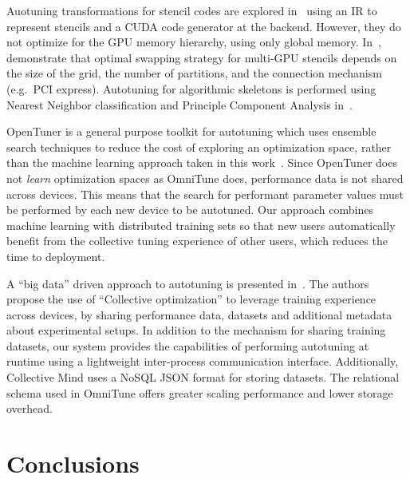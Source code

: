 \documentclass[nonatbib,preprint,nocopyrightspace,9pt]{sigplanconf}
\begin{document}
Auotuning transformations for stencil codes are explored
in~\cite{Kamil2010} using an IR to represent stencils and a CUDA code
generator at the backend. However, they do not optimize for the GPU
memory hierarchy, using only global memory. In~\cite{Lutz2013},
\citeauthor{Lutz2013} demonstrate that optimal swapping strategy for
multi-GPU stencils depends on the size of the grid, the number of
partitions, and the connection mechanism (e.g.\ PCI
express). Autotuning for algorithmic skeletons is performed using
Nearest Neighbor classification and Principle Component Analysis
in~\cite{Collins2013}.

OpenTuner is a general purpose toolkit for autotuning which uses
ensemble search techniques to reduce the cost of exploring an
optimization space, rather than the machine learning approach taken in
this work~\cite{Ansel2013}. Since OpenTuner does not \emph{learn}
optimization spaces as OmniTune does, performance data is not shared
across devices. This means that the search for performant parameter
values must be performed by each new device to be autotuned. Our
approach combines machine learning with distributed training sets so
that new users automatically benefit from the collective tuning
experience of other users, which reduces the time to deployment.

A ``big data'' driven approach to autotuning is presented
in~\cite{Fursin2014}. The authors propose the use of ``Collective
optimization'' to leverage training experience across devices, by
sharing performance data, datasets and additional metadata about
experimental setups. In addition to the mechanism for sharing training
datasets, our system provides the capabilities of performing
autotuning at runtime using a lightweight inter-process communication
interface. Additionally, Collective Mind uses a NoSQL JSON format for
storing datasets. The relational schema used in OmniTune offers
greater scaling performance and lower storage overhead.


\section{Conclusions}\label{sec:conclusions}
\end{document}

